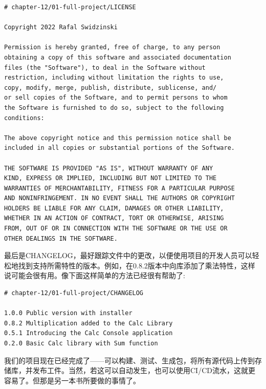 \begin{lstlisting}[style=stylePython]
# chapter-12/01-full-project/LICENSE

Copyright 2022 Rafal Swidzinski

Permission is hereby granted, free of charge, to any person
obtaining a copy of this software and associated documentation
files (the "Software"), to deal in the Software without
restriction, including without limitation the rights to use,
copy, modify, merge, publish, distribute, sublicense, and/
or sell copies of the Software, and to permit persons to whom
the Software is furnished to do so, subject to the following
conditions:

The above copyright notice and this permission notice shall be
included in all copies or substantial portions of the Software.

THE SOFTWARE IS PROVIDED "AS IS", WITHOUT WARRANTY OF ANY
KIND, EXPRESS OR IMPLIED, INCLUDING BUT NOT LIMITED TO THE
WARRANTIES OF MERCHANTABILITY, FITNESS FOR A PARTICULAR PURPOSE
AND NONINFRINGEMENT. IN NO EVENT SHALL THE AUTHORS OR COPYRIGHT
HOLDERS BE LIABLE FOR ANY CLAIM, DAMAGES OR OTHER LIABILITY,
WHETHER IN AN ACTION OF CONTRACT, TORT OR OTHERWISE, ARISING
FROM, OUT OF OR IN CONNECTION WITH THE SOFTWARE OR THE USE OR
OTHER DEALINGS IN THE SOFTWARE.
\end{lstlisting}

最后是CHANGELOG，最好跟踪文件中的更改，以便使用项目的开发人员可以轻松地找到支持所需特性的版本。例如，在0.8.2版本中向库添加了乘法特性，这样说可能会很有用。像下面这样简单的方法已经很有帮助了:

\begin{lstlisting}[style=stylePython]
# chapter-12/01-full-project/CHANGELOG

1.0.0 Public version with installer
0.8.2 Multiplication added to the Calc Library
0.5.1 Introducing the Calc Console application
0.2.0 Basic Calc library with Sum function
\end{lstlisting}

我们的项目现在已经完成了——可以构建、测试、生成包，将所有源代码上传到存储库，并发布工件。当然，若这可以自动发生，也可以使用CI/CD流水，这就更容易了。但那是另一本书所要做的事情了。












